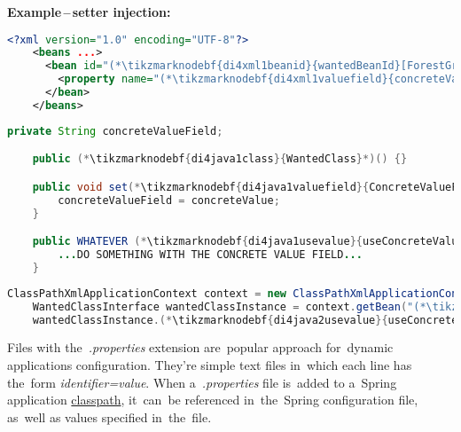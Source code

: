 \noindent \textbf{Example\,--\,setter injection:}
\begin{lstlisting}[language=XML, title={Configuration XML}]
    <?xml version="1.0" encoding="UTF-8"?>
    <beans ...>
      <bean id="(*\tikzmarknodebf{di4xml1beanid}{wantedBeanId}[ForestGreen]*)" class="package.subfolder.(*\tikzmarknodebf{di4xml1class}{WantedClass}[ForestGreen]*)">
        <property name="(*\tikzmarknodebf{di4xml1valuefield}{concreteValueField}[ForestGreen]*)" value="someValue"/>
      </bean>
    </beans>
\end{lstlisting}
\begin{lstlisting}[language=Java, title={Wanted class with the zero--parameter constructor and the setter method}]
    private String concreteValueField;

    public (*\tikzmarknodebf{di4java1class}{WantedClass}*)() {}

    public void set(*\tikzmarknodebf{di4java1valuefield}{ConcreteValueField}*)(String concreteValue) {
        concreteValueField = concreteValue;
    }

    public WHATEVER (*\tikzmarknodebf{di4java1usevalue}{useConcreteValue}*)() {
        ...DO SOMETHING WITH THE CONCRETE VALUE FIELD...
    }
\end{lstlisting}
\begin{lstlisting}[language=Java, title={Usage}]
    ClassPathXmlApplicationContext context = new ClassPathXmlApplicationContext("configurationFile.xml");
    WantedClassInterface wantedClassInstance = context.getBean("(*\tikzmarknodebf{di4java2beanid}{wantedBeanId}[ForestGreen]*)", WantedClassInterface.class);
    wantedClassInstance.(*\tikzmarknodebf{di4java2usevalue}{useConcreteValue}*)();
\end{lstlisting}

Files with the~\textit{.properties} extension are~popular approach for~dynamic applications configuration. They're simple text files in~which each line has the~form \textit{identifier=value}. When a~\textit{.properties} file is~added to a~Spring application \hyperref[classpath]{classpath}, it~can~be referenced in~the~Spring configuration file, as~well as values specified in~the~file.

